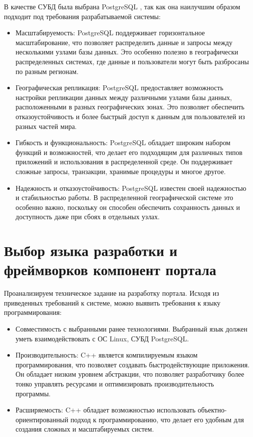 В качестве СУБД была выбрана PostgreSQL \cite{bib:postgres}, так как она наилучшим образом подходит под требования разрабатываемой системы:
\begin{itemize}
    \item Масштабируемость: PostgreSQL поддерживает горизонтальное масштабирование, что позволяет распределить данные и запросы между несколькими узлами базы данных. Это особенно полезно в географически распределенных системах, где данные и пользователи могут быть разбросаны по разным регионам.
    \item Географическая репликация: PostgreSQL предоставляет возможность настройки репликации данных между различными узлами базы данных, расположенными в разных географических зонах. Это позволяет обеспечить отказоустойчивость и более быстрый доступ к данным для пользователей из разных частей мира.
    \item Гибкость и функциональность: PostgreSQL обладает широким набором функций и возможностей, что делает его подходящим для различных типов приложений и использования в распределенной среде. Он поддерживает сложные запросы, транзакции, хранимые процедуры и многое другое.
    \item Надежность и отказоустойчивость: PostgreSQL известен своей надежностью и стабильностью работы. В распределенной географической системе это особенно важно, поскольку он способен обеспечить сохранность данных и доступность даже при сбоях в отдельных узлах.
\end{itemize}

\section{Выбор языка разработки и фреймворков компонент портала}
Проанализируем техническое задание на разработку портала. Исходя из приведенных требований к системе, можно выявить требования к языку программирования:
\begin{itemize}
    \item Совместимость с выбранными ранее технологиями. Выбранный язык должен уметь взаимодействовать с ОС Linux, СУБД PostgreSQL.
    \item Производительность: C++ является компилируемым языком программирования, что позволяет создавать быстродействующие приложения. Он обладает низким уровнем абстракции, что позволяет разработчику более тонко управлять ресурсами и оптимизировать производительность программы.
    \item Расширяемость: C++ обладает возможностью использовать объектно-ориентированный подход к программированию, что делает его удобным для создания сложных и масштабируемых систем.
\end{itemize}


